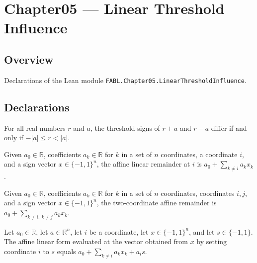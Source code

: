 \chapter{Chapter05 — Linear Threshold Influence}
\section{Overview}

Declarations of the Lean module \texttt{FABL.Chapter05.LinearThresholdInfluence}.

\section{Declarations}

\begin{theorem}
\label{FABL.thresholdSign_add_ne_sub_iff}
\leanok
{}
For all real numbers $r$ and $a$, the threshold signs of $r+a$ and $r-a$ differ if and
only if $-|a|\le r<|a|$.
\end{theorem}

\begin{definition}
\label{FABL.affineLinearRemainder}
\leanok
{}
Given $a_0\in\mathbb R$, coefficients $a_k\in\mathbb R$ for $k$ in a set of $n$
coordinates, a coordinate $i$, and a sign vector $x\in\{-1,1\}^n$, the affine linear
remainder at $i$ is $a_0+\sum_{k\ne i}a_k x_k$.
\end{definition}

\begin{definition}
\label{FABL.affineLinearRemainderTwo}
\leanok
{}
Given $a_0\in\mathbb R$, coefficients $a_k\in\mathbb R$ for $k$ in a set of $n$
coordinates, coordinates $i,j$, and a sign vector $x\in\{-1,1\}^n$, the two-coordinate
affine remainder is $a_0+\sum_{k\ne i,\ k\ne j}a_k x_k$.
\end{definition}

\begin{theorem}
\label{FABL.affineLinearForm_setCoordinate}
\leanok
{}
Let $a_0\in\mathbb{R}$, let $a\in\mathbb{R}^n$, let $i$ be a coordinate, let
$x\in\{-1,1\}^n$, and let $s\in\{-1,1\}$. The affine linear form evaluated at the vector
obtained from $x$ by setting coordinate $i$ to $s$ equals $a_0+\sum_{k\ne
i}a_kx_k+a_is$.
\end{theorem}


